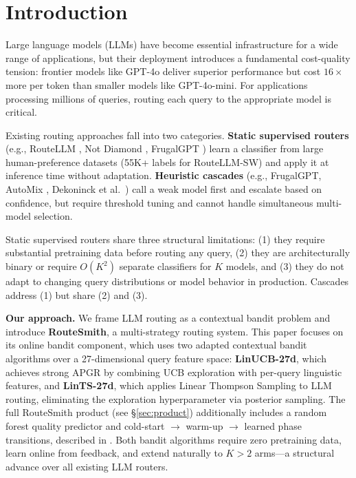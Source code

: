 \section{Introduction}
\label{sec:intro}

Large language models (LLMs) have become essential infrastructure for a wide range of applications, but their deployment introduces a fundamental cost-quality tension: frontier models like GPT-4o deliver superior performance but cost $16\times$ more per token than smaller models like GPT-4o-mini. For applications processing millions of queries, routing each query to the appropriate model is critical.

Existing routing approaches fall into two categories. \textbf{Static supervised routers} (e.g., RouteLLM \citep{ong2024routellm}, Not Diamond \citep{notdiamond2024}, FrugalGPT \citep{chen2023frugalgpt}) learn a classifier from large human-preference datasets (55K+ labels for RouteLLM-SW) and apply it at inference time without adaptation. \textbf{Heuristic cascades} (e.g., FrugalGPT, AutoMix \citep{aggarwal2024automix}, Dekoninck et al.\ \citep{dekoninck2025unified}) call a weak model first and escalate based on confidence, but require threshold tuning and cannot handle simultaneous multi-model selection.

Static supervised routers share three structural limitations: (1) they require substantial pretraining data before routing any query, (2) they are architecturally binary or require $O(K^2)$ separate classifiers for $K$ models, and (3) they do not adapt to changing query distributions or model behavior in production. Cascades address (1) but share (2) and (3).

\textbf{Our approach.} We frame LLM routing as a contextual bandit problem and introduce \textbf{RouteSmith}, a multi-strategy routing system. This paper focuses on its online bandit component, which uses two adapted contextual bandit algorithms over a 27-dimensional query feature space: \textbf{LinUCB-27d}, which achieves strong APGR by combining UCB exploration with per-query linguistic features, and \textbf{LinTS-27d}, which applies Linear Thompson Sampling \citep{abeille2017linear} to LLM routing, eliminating the exploration hyperparameter via posterior sampling. The full RouteSmith product (see \S\ref{sec:product}) additionally includes a random forest quality predictor and cold-start $\rightarrow$ warm-up $\rightarrow$ learned phase transitions, described in \citet{routesmith2025system}. Both bandit algorithms require zero pretraining data, learn online from feedback, and extend naturally to $K > 2$ arms\mbox{---}a structural advance over all existing LLM routers.

